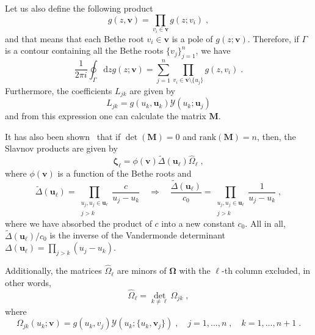 \documentclass[a4paper,12pt]{amsart}
\begin{document}
Let us also define the following product 
\begin{equation}
  g(z, \bm{v}) = \prod_{v_i\in \bm{v}} g(z; v_i)\; , 
\end{equation}
and that means that each Bethe root \( v_i \in \bm{v}\) 
is a pole of \(g(z;\bm{v})\). Therefore, if \(\Gamma\) is a contour
containing all the Bethe roots \(\{v_j\}_{j=1}^n\), we have 
\begin{equation}
  \frac{1}{2 \pi i}\oint_{\Gamma} \mathrm{d}z g(z; \bm{v}) = \sum_{j=1}^n  \prod_{v_i \in \bm{v}\setminus \{u_j\}} g(z, v_i)\; .
\end{equation}
Furthermore, the coefficients \(L_{jk}\) are given by
\begin{equation}
  L_{jk} = g(u_k, \bm{u}_k) \mathcal{Y}(u_k; \bm{u}_j)
\end{equation}
and from this expression one can calculate the matrix \(\bm{M}\).

It has also been shown~\cite{Belliard:2019bfz} that if \(\det
(\bm{M}) = 0 \) and \(\mathrm{rank}(\bm{M}) = n\), then, the Slavnov
products are given by
\begin{equation}
 \bm{\zeta}_\ell = \phi(\bm{v}) \tilde{\Delta}(\bm{u}_\ell)\hat{\Omega}_\ell\; ,
\end{equation}
where \(\phi(\bm{v})\) is a function of the Bethe roots and
\begin{equation}
  \tilde{\Delta}(\bm{u}_\ell) = \prod_{\substack{u_j, u_j \in \bm{u}_\ell \\ j>k}} \frac{c}{u_j - u_k}\quad \Rightarrow \quad
\frac{\tilde{\Delta}(\bm{u}_\ell)}{c_0} = \prod_{\substack{u_j, u_j \in \bm{u}_\ell \\ j>k}} \frac{1}{u_j - u_k}\; , 
\end{equation}
where we have absorbed the product of \(c\) into a new constant \(c_0\). 
All in all, \(\tilde{\Delta}(\bm{u}_\ell)/c_0\) is the inverse of the Vandermonde determinant
\(\Delta(\bm{u}_\ell) = \prod_{j>k}(u_j - u_k)\).

Additionally, the matrices \(\hat{\Omega}_\ell\) are minors of
\(\bm{\Omega}\) with the \(\ell\)-th column excluded, in other words,
\begin{equation}
 \hat{\Omega}_\ell = \det_{k\neq \ell} \Omega_{jk}\; ,
\end{equation}
where
\begin{equation}
  \Omega_{jk}(u_k; \bm{v}) = g(u_k, v_j) \mathcal{Y}(u_k; \{u_k, \bm{v}_j\})\; ,
  \quad j= 1, \dots, n\; , \quad k =1, \dots, n+1\; .
\end{equation}
\end{document}
